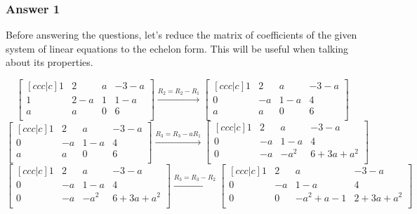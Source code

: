 \documentclass[11pt]{article}
\begin{document}
\subsubsection{Answer 1}
\label{sec-1-1-1}

Before answering the questions, let's reduce the matrix of coefficients of
the given system of linear equations to the echelon form.  This will be
useful when talking about its properties.

\begin{equation*}
  \begin{bmatrix}[ccc|c]
    1 & 2   & a & -3-a \\
    1 & 2-a & 1 & 1-a \\
    a & a   & 0 & 6 \\
  \end{bmatrix}
  \xrightarrow{R_2 = R_2 - R_1}
  \begin{bmatrix}[ccc|c]
    1 & 2  & a   & -3-a \\
    0 & -a & 1-a & 4 \\
    a & a  & 0   & 6 \\
  \end{bmatrix}
\end{equation*}
\begin{equation*}
  \begin{bmatrix}[ccc|c]
    1 & 2  & a   & -3-a \\
    0 & -a & 1-a & 4 \\
    a & a  & 0   & 6 \\
  \end{bmatrix}
  \xrightarrow{R_3 = R_3 - aR_1}
  \begin{bmatrix}[ccc|c]
    1 & 2  & a    & -3-a \\
    0 & -a & 1-a  & 4 \\
    0 & -a & -a^2 & 6+3a+a^2 \\
  \end{bmatrix}
\end{equation*}
\begin{equation*}
  \begin{bmatrix}[ccc|c]
    1 & 2  & a    & -3-a \\
    0 & -a & 1-a  & 4 \\
    0 & -a & -a^2 & 6+3a+a^2 \\
  \end{bmatrix}
  \xrightarrow{R_3 = R_3 - R_2}
  \begin{bmatrix}[ccc|c]
    1 & 2  & a        & -3-a \\
    0 & -a & 1-a      & 4 \\
    0 & 0  & -a^2+a-1 & 2+3a+a^2 \\
  \end{bmatrix}
\end{equation*}
\end{document}
